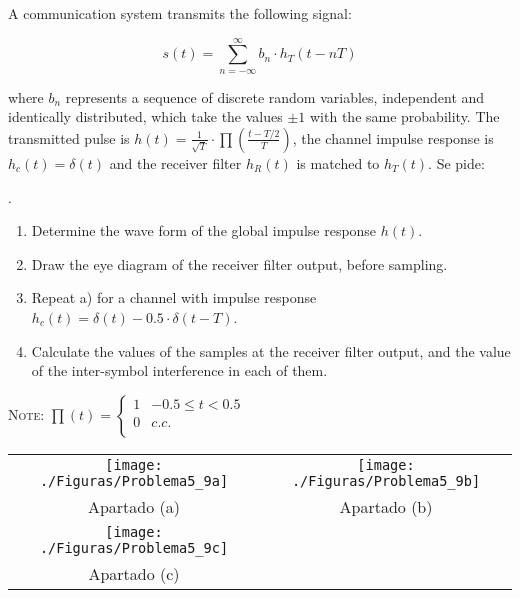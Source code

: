 \documentclass[idioma,boletin]{uah}
\begin{document}
{

A communication system transmits the following signal:

\begin{displaymath}
s(t) = \sum_{n=-\infty}^{\infty} b_n \cdot h_T(t-nT)
\end{displaymath}

where $b_n$ represents a sequence of discrete random variables, independent and identically distributed, which take the values $\pm 1$ with the same probability. The transmitted pulse is $h(t) = \frac{1}{\sqrt{T}} \cdot \prod \left ( \frac{t-T/2}{T} \right )$, the channel impulse response is $h_c(t)=\delta (t)$ and the receiver filter $h_R(t)$ is matched to $h_T(t)$. Se pide:


	.
	
	
	

\begin{enumerate}
	\item Determine the wave form of the global impulse response $h(t)$.
	\item Draw the eye diagram of the receiver filter output, before sampling.
	\item Repeat a) for a channel with impulse response $h_c(t)=\delta (t) - 0.5 \cdot \delta (t-T)$.
	\item Calculate the values of the samples at the receiver filter output, and the value of the inter-symbol interference in each of them.
\end{enumerate}

\textsc{Note:} $\prod(t) = \left \{ \begin{array}{ll} 1 & -0.5\leq t <0.5 \\ 0 & c.c. \\
 \end{array} \right.$
 \ \\

}
{

\begin{tabular}[h]{cc}
	\texttt{[image: ./Figuras/Problema5\_9a]} &
	\texttt{[image: ./Figuras/Problema5\_9b]} \\
	Apartado (a) & Apartado (b) \\
	\texttt{[image: ./Figuras/Problema5\_9c]} &
	\\
	Apartado (c) & \\
\end{tabular}

}
\end{document}
